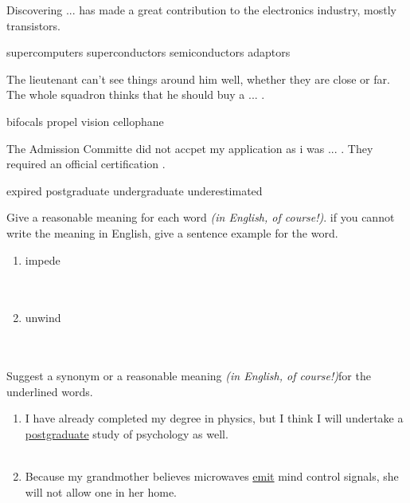 \documentclass{exam}
\begin{document}
\begin{questions}
\question Discovering ... has made a great contribution to the electronics industry, mostly transistors.\\
\begin{oneparchoices} 
\choice supercomputers
\choice superconductors
\correctchoice semiconductors
\choice adaptors
\end{oneparchoices}

\question The lieutenant can't see things around him well, whether they are close or far. The whole squadron thinks that he should buy a ... .\\
\begin{oneparchoices}
 \correctchoice bifocals
 \choice propel
 \choice vision
 \choice cellophane
\end{oneparchoices}

\question The Admission Committe did not accpet my application as i was ... . They required an official certification . \\
\begin{oneparchoices}
\choice expired
\choice postgraduate
\correctchoice undergraduate
\choice underestimated
\end{oneparchoices}

\question Give a reasonable meaning for each word \emph{(in English, of course!)}. if you cannot write the meaning in English, give a sentence example for the word.\\
\begin{enumerate}
	\item impede \\ \\\\
	\item unwind \\ \\\\
\end{enumerate}
\question Suggest a synonym or a reasonable meaning \emph{(in English, of course!)}for the underlined words.\\
\begin{enumerate}
	\item I have already completed my degree in physics, but I think I will undertake a \underline{postgraduate} study of psychology as well.\\ \\
	\item Because my grandmother believes microwaves \underline{emit} mind control signals, she will not allow one in her home.\\ \\
\end{enumerate}

\end{questions}
\end{document}
